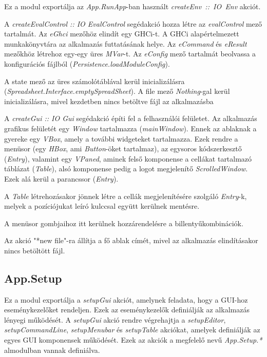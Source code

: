 Ez a modul exportálja az \textit{App.RunApp}-ban használt \mbox{\textit{createEnv :: IO Env}} akciót.

A \textit{createEvalControl :: IO EvalControl} segédakció hozza létre az \textit{evalControl} mező tartalmát. Az \textit{eGhci} mezőhöz elindít egy GHCi-t. A GHCi alapértelmezett munkakönyvtára az alkalmazás futtatásának helye. Az \textit{eCommand} és \textit{eResult} mezőkhöz létrehoz egy-egy üres \textit{MVar}-t. Az \textit{eConfig} mező tartalmát beolvassa a konfigurációs fájlból (\textit{Persistence.loadModuleConfig}).

A state mező az üres számolótáblával kerül inicializálásra (\textit{Spreadsheet.Interface.emptySpreadSheet}). A file mező \textit{Nothing}-gal kerül inicializálásra, mivel kezdetben nincs betöltve fájl az alkalmazásba

A \textit{createGui :: IO Gui} segédakció építi fel a felhasználói felületet. Az alkalmazás grafikus felületét egy \textit{Window} tartalmazza (\textit{mainWindow}). Ennek az ablaknak a gyereke egy \textit{VBox}, amely a további widgeteket tartalmazza.   Ezek rendre a menüsor (egy \textit{HBox}, ami \textit{Button}-öket tartalmaz),  az egysoros kódszerkesztő (\textit{Entry}), valamint egy \textit{VPaned}, aminek felső komponense a cellákat tartalmazó táblázat (\textit{Table}), alsó komponense pedig a logot megjelenítő \textit{ScrolledWindow}. Ezek alá kerül a parancssor (\textit{Entry}).

A \textit{Table} létrehozásakor jönnek létre a cellák megjelenítésére szolgáló \textit{Entry}-k, melyek a pozíciójukat leíró kulccsal együtt kerülnek mentésre.

A menüsor gombjaihoz itt kerülnek hozzárendelésre a billentyűkombinációk.

Az akció "*new file"-ra állítja a fő ablak címét, mivel az alkalmazás elindításakor nincs betöltött fájl.

\subsection{App.Setup}

Ez a modul exportálja a \textit{setupGui} akciót, amelynek feladata, hogy a GUI-hoz eseménykezelőket rendeljen. Ezek az eseménykezelők definiálják az alkalmazás lényegi működését. A \textit{setupGui} akció rendre végrehajtja a \textit{setupEditor}, \textit{setupCommandLine}, \textit{setupMenubar} és \textit{setupTable} akciókat, amelyek definiálják az egyes GUI komponensek működését. Ezek az akciók a megfelelő nevű \textit{App.Setup.*} almodulban vannak definiálva.

